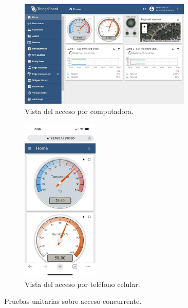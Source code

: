 \begin{figure}[htpb]
     \centering
       \begin{subfigure}[b]{0.53\textwidth}
	    \centering
		 \includegraphics[width=0.9\textwidth]{./Figures/chapter4/tb_compu.jpg}
		\caption{Vista del acceso por computadora.}
		\label{fig:tb_compu}
     \end{subfigure}
          \hfill
     \begin{subfigure}[b]{0.45\textwidth}
		\centering
		\includegraphics[width=0.40\textwidth]{./Figures/chapter4/tb_celu.jpg}
		\caption{Vista del acceso por teléfono celular.}
		\label{fig:tb_celu}
     \end{subfigure}
     \hfill
        \caption[Pruebas unitarias sobre acceso concurrente]{Pruebas unitarias sobre acceso concurrente.}
        \label{fig:tb_concurrencia}
\end{figure}

